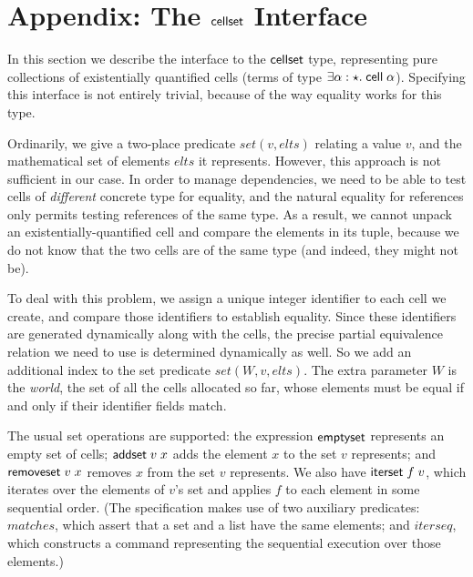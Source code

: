\documentclass[preprint,natbib]{sigplanconf}
\begin{document}
{}


% 
% 
% 
% 

\appendix

\section{Appendix: The $\mbox{\textsf{{cellset}}}$ Interface}

In this section we describe the interface to the $\mbox{\textsf{{cellset}}}$ type,
representing pure collections of existentially quantified cells
(terms of type $\exists \alpha:\star.\;
\mbox{\textsf{{cell}}}\;{\alpha}$). Specifying this interface is not entirely
trivial, because of the way equality works for this type. 

Ordinarily, we give a two-place predicate $set(v, elts)$ relating a
value $v$, and the mathematical set of elements $elts$ it represents.
However, this approach is not sufficient in our case. In order to
manage dependencies, we need to be able to test cells of
\emph{different} concrete type for equality, and the natural equality
for references only permits testing references of the same type. As a
result, we cannot unpack an existentially-quantified cell and compare
the elements in its tuple, because we do not know that the two cells
are of the same type (and indeed, they might not be). 

To deal with this problem, we assign a unique integer identifier to
each cell we create, and compare those identifiers to establish
equality. Since these identifiers are generated dynamically along with
the cells, the precise partial equivalence relation we need to use is
determined dynamically as well. So we add an additional index to the
set predicate $set(W, v, elts)$. The extra parameter $W$ is the
\emph{world}, the set of all the cells allocated so far, whose
elements must be equal if and only if their identifier fields match.

The usual set operations are supported: the expression
$\mbox{\textsf{{emptyset}}}$ represents an empty set of cells; 
$\mbox{\textsf{{addset}}}\;v\;x$ adds the element $x$ to the set $v$
represents; and $\mbox{\textsf{{removeset}}}\;v\;x$ removes $x$ from the
set $v$ represents. We also have $\mbox{\textsf{{iterset}}}\;f\;v$, which
iterates over the elements of $v$'s set and applies $f$ to each
element in some sequential order. (The specification
makes use of two auxiliary predicates: $\mathit{matches}$, which assert that a
set and a list have the same elements; and $\mathit{iterseq}$, which constructs
a command representing the sequential execution over those elements.)
\end{document}
